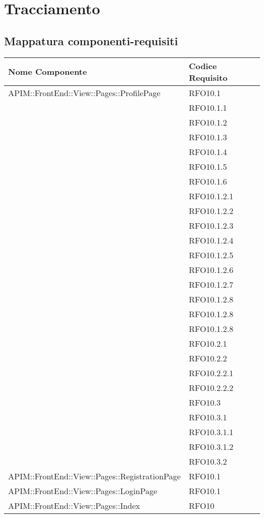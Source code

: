 \newpage
\renewcommand*{\arraystretch}{1.6}

\section{Tracciamento}
\subsection{Mappatura componenti-requisiti}



		\begin{longtable}{ p{11cm} | p{5cm} }
			\hline
			\textbf{Nome Componente} & \textbf{Codice Requisito} \\
			\hline
			APIM::FrontEnd::View::Pages::ProfilePage& RFO10.1 \\
			& RFO10.1.1 \\
			& RFO10.1.2 \\
			& RFO10.1.3 \\
			& RFO10.1.4 \\
			& RFO10.1.5 \\
			& RFO10.1.6 \\
			& RFO10.1.2.1 \\
			& RFO10.1.2.2 \\
			& RFO10.1.2.3 \\
			& RFO10.1.2.4 \\
			& RFO10.1.2.5 \\
			& RFO10.1.2.6 \\
			& RFO10.1.2.7 \\
			& RFO10.1.2.8 \\
			& RFO10.1.2.8 \\
			& RFO10.1.2.8 \\
			&RFO10.2.1 \\
			&RFO10.2.2 \\
			&RFO10.2.2.1 \\
			&RFO10.2.2.2 \\
			&RFO10.3 \\
			&RFO10.3.1 \\
			&RFO10.3.1.1 \\
			&RFO10.3.1.2 \\
			&RFO10.3.2 \\
			\hline
			APIM::FrontEnd::View::Pages::RegistrationPage& RFO10.1 \\
			\hline
			APIM::FrontEnd::View::Pages::LoginPage& RFO10.1 \\
			\hline
			APIM::FrontEnd::View::Pages::Index& RFO10 \\

\end{longtable}
